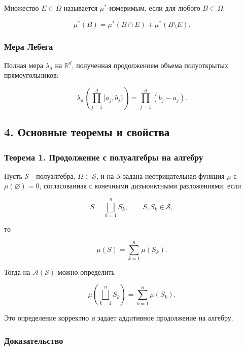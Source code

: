 \documentclass[
  11pt,
  a4paper,
]{article}
\begin{document}
Множество \(E\subset\Omega\) называется \(\mu^*\)-измеримым, если для
любого \(B\subset\Omega\):

\[
\mu^*(B)=\mu^*(B\cap E)+\mu^*(B\setminus E).
\]

\subsubsection{Мера
Лебега}\label{ux43cux435ux440ux430-ux43bux435ux431ux435ux433ux430}

Полная мера \(\lambda_d\) на \(\mathbb R^d\), полученная продолжением
объема полуоткрытых прямоугольников:

\[
\lambda_d\left(\prod_{j=1}^d[a_j,b_j)\right)
=
\prod_{j=1}^d(b_j-a_j).
\]

\subsection{4. Основные теоремы и
свойства}\label{ux43eux441ux43dux43eux432ux43dux44bux435-ux442ux435ux43eux440ux435ux43cux44b-ux438-ux441ux432ux43eux439ux441ux442ux432ux430}

\subsubsection{Теорема 1. Продолжение с полуалгебры на
алгебру}\label{ux442ux435ux43eux440ux435ux43cux430-1.-ux43fux440ux43eux434ux43eux43bux436ux435ux43dux438ux435-ux441-ux43fux43eux43bux443ux430ux43bux433ux435ux431ux440ux44b-ux43dux430-ux430ux43bux433ux435ux431ux440ux443}

Пусть \(\mathcal S\) - полуалгебра, \(\Omega\in\mathcal S\), и на
\(\mathcal S\) задана неотрицательная функция \(\mu\) с
\(\mu(\varnothing)=0\), согласованная с конечными дизъюнктными
разложениями: если

\[
S=\bigsqcup_{k=1}^n S_k,\qquad S,S_k\in\mathcal S,
\]

то

\[
\mu(S)=\sum_{k=1}^n\mu(S_k).
\]

Тогда на \(\mathcal A(\mathcal S)\) можно определить

\[
\mu\left(\bigsqcup_{k=1}^n S_k\right)
=
\sum_{k=1}^n\mu(S_k).
\]

Это определение корректно и задает аддитивное продолжение на алгебру.

\subsubsection{Доказательство}\label{ux434ux43eux43aux430ux437ux430ux442ux435ux43bux44cux441ux442ux432ux43e}
\end{document}
